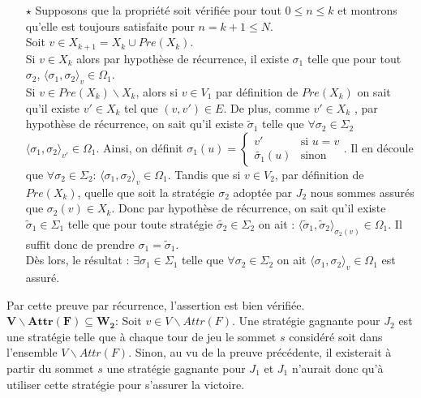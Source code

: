 \begin{demonstration}
\begin{enumerate}
			\item[$\star$] Supposons que la propriété soit vérifiée pour tout $ 0 \leq n \leq k $ et montrons qu'elle est toujours satisfaite pour $n = k + 1 \leq N$. \\
			Soit $v \in X_{k+1} = X_{k} \cup Pre(X_{k})$. \\
			Si $v \in X_{k}$ alors par hypothèse de récurrence, il existe $\sigma _{1}$ telle que pour tout $\sigma_2$, $ \langle \sigma _{1},\sigma _{2} \rangle_v \in \Omega _{1}$.\\
			Si $v \in Pre(X_{k})\backslash X_k$, alors si $v \in V_{1}$ par définition de $Pre(X_{k})$ on sait qu'il existe $v'\in X_{k}$ tel que $(v,v')\in E$. De plus, comme $v' \in X_k$ , par hypothèse de récurrence, on sait qu'il existe $\tilde{\sigma}_1$ telle que $\forall \sigma_2 \in \Sigma_2$ $\langle \sigma_1, \sigma_2 \rangle_{v'} \in \Omega_1$. Ainsi, on définit $\sigma _{1}(u) =\begin{cases} v' & \text{si } u = v \\ \tilde{\sigma_1}(u) & \text{sinon} \end{cases}$. Il en découle que $\forall \sigma_2 \in \Sigma_2$: $\langle \sigma_1, \sigma_2 \rangle_v \in \Omega_1$.
			 Tandis que si $v \in V_{2}$, par définition de $Pre(X_k)$, quelle que soit la stratégie $\sigma _{2}$ adoptée par $J_{2}$  nous sommes assurés que $\sigma _{2}(v) \in X_{k}$. Donc par hypothèse de récurrence, on sait qu'il existe $\tilde{\sigma}_1 \in \Sigma_1$ telle que pour toute stratégie $\tilde{\sigma_2} \in \Sigma_2$ on ait : $\langle \tilde{\sigma}_1, \tilde{\sigma}_2 \rangle_{\sigma_2(v)} \in \Omega_1$. Il suffit donc de prendre $\sigma_1  = \tilde{\sigma}_1$.\\
			
			 Dès lors, le résultat : $\exists \sigma_1 \in \Sigma_1$ telle que $\forall \sigma_2 \in \Sigma_2$ on ait $ \langle \sigma _{1},\sigma _{2} \rangle_v \in \Omega _{1}$ est assuré.
		\end{enumerate}
		Par cette preuve par récurrence, l'assertion est bien vérifiée.\\
		
		\noindent$\mathbf{V \backslash Attr(F) \subseteq W_{2}}$: Soit $v \in V \backslash Attr(F)$. Une stratégie gagnante pour $J_{2}$ est une stratégie telle que à chaque tour de jeu le sommet $s$ considéré soit dans l'ensemble $V\backslash Attr(F)$. Sinon, au vu de la preuve précédente, il existerait à partir du sommet $s$ une stratégie gagnante pour $J_{1}$ et $J_{1}$ n'aurait donc qu'à utiliser cette stratégie pour s'assurer la victoire. \\
		

\end{demonstration}
